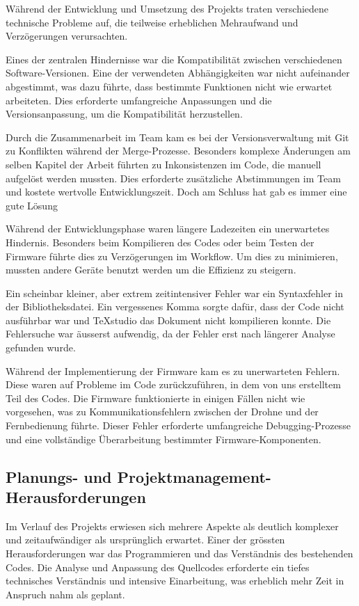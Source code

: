 Während der Entwicklung und Umsetzung des Projekts traten verschiedene technische Probleme auf, die teilweise erheblichen Mehraufwand und Verzögerungen verursachten.   

Eines der zentralen Hindernisse war die Kompatibilität zwischen verschiedenen Software-Versionen. Eine der verwendeten Abhängigkeiten war nicht aufeinander abgestimmt, was dazu führte, dass bestimmte Funktionen nicht wie erwartet arbeiteten. Dies erforderte umfangreiche Anpassungen und die Versionsanpassung, um die Kompatibilität herzustellen.  
 
Durch die Zusammenarbeit im Team kam es bei der Versionsverwaltung mit Git zu Konflikten während der Merge-Prozesse. Besonders komplexe Änderungen am selben Kapitel der Arbeit führten zu Inkonsistenzen im Code, die manuell aufgelöst werden mussten. Dies erforderte zusätzliche Abstimmungen im Team und kostete wertvolle Entwicklungszeit. Doch am Schluss hat gab es immer eine gute Lösung

Während der Entwicklungsphase waren längere Ladezeiten ein unerwartetes Hindernis. Besonders beim Kompilieren des Codes oder beim Testen der Firmware führte dies zu Verzögerungen im Workflow. Um dies zu minimieren, mussten andere Geräte benutzt werden um die Effizienz zu steigern.  

Ein scheinbar kleiner, aber extrem zeitintensiver Fehler war ein Syntaxfehler in der Bibliotheksdatei. Ein vergessenes Komma sorgte dafür, dass der Code nicht ausführbar war und TeXstudio das Dokument nicht kompilieren konnte. Die Fehlersuche war äusserst aufwendig, da der Fehler erst nach längerer Analyse gefunden wurde.  

Während der Implementierung der Firmware kam es zu unerwarteten Fehlern. Diese waren auf Probleme im Code zurückzuführen, in dem von uns erstelltem Teil des Codes. Die Firmware funktionierte in einigen Fällen nicht wie vorgesehen, was zu Kommunikationsfehlern zwischen der Drohne und der Fernbedienung führte. Dieser Fehler erforderte umfangreiche Debugging-Prozesse und eine vollständige Überarbeitung bestimmter Firmware-Komponenten.  


\subsection{Planungs- und Projektmanagement-Herausforderungen}

Im Verlauf des Projekts erwiesen sich mehrere Aspekte als deutlich komplexer und zeitaufwändiger als ursprünglich erwartet. Einer der grössten Herausforderungen war das Programmieren und das Verständnis des bestehenden Codes. Die Analyse und Anpassung des Quellcodes erforderte ein tiefes technisches Verständnis und intensive Einarbeitung, was erheblich mehr Zeit in Anspruch nahm als geplant.

